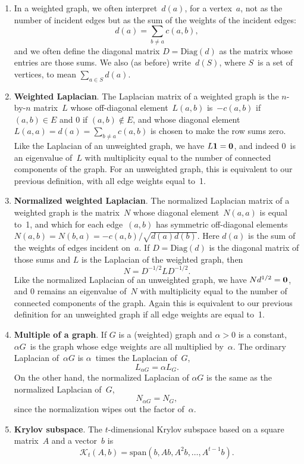 \documentclass[11pt]{article}
\newcommand{\m}[1]{{\bf{#1}}}       %
\newcommand{\ones}{\m1}             %
\newcommand{\zeros}{\m0}            %
\newcommand{\Diag}{\mbox{Diag}}
\newcommand{\krylov}{\mathcal{K}}       %
\begin{document}
\begin{enumerate}
\item
In a weighted graph, we often interpret~$d(a)$, for a vertex~$a$,
not as the number of incident edges but as the sum of the weights
of the incident edges:
$$d(a) = \sum_{b \neq a}c(a,b),$$
and we often define the diagonal matrix $D = \Diag(d)$ as the matrix
whose entries are those sums.
We also (as before) write~$d(S)$, where $S$~is a set of vertices, 
to mean $\sum_{a \in S}d(a)$.

\item\label{wlap}{\bf Weighted Laplacian}.
The Laplacian matrix of a weighted graph
is the $n$-by-$n$ matrix~$L$ whose off-diagonal
element~$L(a,b)$ is~$-c(a,b)$ if $(a,b) \in E$ and $0$ if $(a,b) \notin E$,
and whose diagonal element $L(a,a) = d(a) = \sum_{b \neq a}c(a,b)$ 
is chosen to make the row sums zero.
Like the Laplacian of an unweighted graph, we have $L\ones=\zeros$, 
and indeed 0~is an eigenvalue of~$L$ with multiplicity equal to the 
number of connected components of the graph.
For an unweighted graph, this is equivalent to our previous definition,
with all edge weights equal to~1.

\item\label{wnorm}{\bf Normalized weighted Laplacian}.
The normalized Laplacian matrix of a weighted graph is the matrix~$N$
whose diagonal element~$N(a,a)$ is equal to~1,
and which for each edge~$(a,b)$ has symmetric off-diagonal elements 
$N(a,b) = N(b,a) = -c(a,b)/\sqrt{d(a)d(b)}$.
Here $d(a)$ is the sum of the weights of edges incident on~$a$.
If $D = \Diag(d)$ is the diagonal matrix of those sums
and $L$ is the Laplacian of the weighted graph, then
$$N = D^{-1/2}LD^{-1/2}.$$
Like the normalized Laplacian of an unweighted graph, 
we have $Nd^{1/2}=\zeros$, 
and 0 remains an eigenvalue of~$N$ with multiplicity equal to the 
number of connected components of the graph.
Again this is equivalent to our previous definition for an unweighted graph
if all edge weights are equal to~1.

\item {\bf Multiple of a graph}.
If $G$ is a (weighted) graph and $\alpha>0$ is a constant, $\alpha G$~is the
graph whose edge weights are all multiplied by~$\alpha$.
The ordinary Laplacian of~$\alpha G$ is $\alpha$~times the Laplacian of~$G$,
$$L_{\alpha G} = \alpha L_G.$$ 
On the other hand, the normalized Laplacian of $\alpha G$ is the same as the
normalized Laplacian of~$G$, 
$$N_{\alpha G} = N_G,$$ 
since the normalization wipes out the factor of~$\alpha$.

\item{\bf Krylov subspace}.
The $t$-dimensional Krylov subspace based on a square matrix~$A$ 
and a vector~$b$ is 
$$\krylov_t(A,b) = \mbox{span}(b,Ab,A^2b,\ldots,A^{t-1}b).$$


\end{enumerate}
\end{document}
